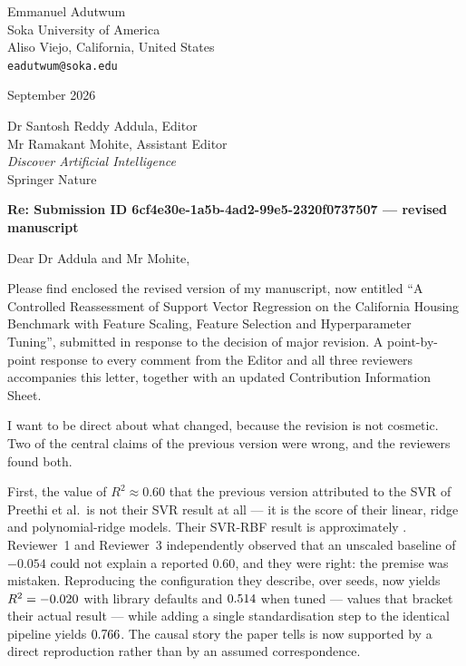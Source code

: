 \documentclass[11pt,a4paper]{article}
\begin{document}
\noindent
Emmanuel Adutwum\\
Soka University of America\\
Aliso Viejo, California, United States\\
\texttt{eadutwum@soka.edu}

\vspace{14pt}
 September 2026

\vspace{14pt}
\noindent
Dr Santosh Reddy Addula, Editor\\
Mr Ramakant Mohite, Assistant Editor\\
\emph{Discover Artificial Intelligence}\\
Springer Nature

\vspace{14pt}
\noindent
\textbf{Re: Submission ID 6cf4e30e-1a5b-4ad2-99e5-2320f0737507 --- revised manuscript}

\vspace{10pt}
\noindent Dear Dr Addula and Mr Mohite,

Please find enclosed the revised version of my manuscript, now entitled ``A Controlled
Reassessment of Support Vector Regression on the California Housing Benchmark with Feature
Scaling, Feature Selection and Hyperparameter Tuning'', submitted in response to the decision
of major revision. A point-by-point response to every comment from the Editor and all three
reviewers accompanies this letter, together with an updated Contribution Information Sheet.

I want to be direct about what changed, because the revision is not cosmetic. Two of the
central claims of the previous version were wrong, and the reviewers found both.

First, the value of $R^2 \approx 0.60$ that the previous version attributed to the SVR of
Preethi et al.\ is not their SVR result at all --- it is the score of their linear, ridge and
polynomial-ridge models. Their SVR-RBF result is approximately \PreethiReportedRtwo{}.
Reviewer~1 and Reviewer~3 independently observed that an unscaled baseline of $-0.054$ could
not explain a reported $0.60$, and they were right: the premise was mistaken. Reproducing the
configuration they describe, over \RepSeeds{} seeds, now yields $R^2 = -0.020$
with library defaults and $0.514$ when tuned --- values that bracket their actual
result --- while adding a single standardisation step to the identical pipeline yields
$0.766$. The causal story the paper tells is now supported by a direct reproduction
rather than by an assumed correspondence.
\end{document}
